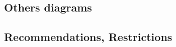 \begin{comment}
Why ? When ? How ?

First ideas :

  	\begin{itemize}
  		\item use case 
  		\item state machines
  		  \begin{itemize}
		  	\item What : description of how the state of the system evolved
		  	\item Why : to describe at high level some behaviour 
		  	\item Recommendations ?
		  \end{itemize}
  		\item activities
  		\item sequence
  		  \begin{itemize}
  	\item What: description of sequence of function
  	\item Why: to describe communication between items, specify expected  (oracle)
  	\item Recommendations: 
  	\begin{itemize}
  		\item limit the size for readability
  	\end{itemize}
  \end{itemize}

	\end{itemize}  	

\end{comment}


\subsection{Others diagrams}


\begin{comment}
Why ? When ? How ?

First ideas :

 	\begin{itemize}
  		\item requirement
  		\item ... ?
	\end{itemize}  	

\end{comment}



\subsection{Recommendations, Restrictions}



\begin{comment}
Which elements are recommended or not.

\end{comment}

